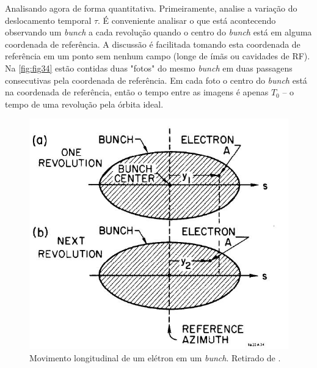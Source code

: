 Analisando agora de forma quantitativa. Primeiramente, analise a variação do deslocamento temporal $\tau$. É conveniente analisar o que está acontecendo observando um \textit{bunch} a cada revolução quando o centro do \textit{bunch} está em alguma coordenada de referência. A discussão é facilitada tomando esta coordenada de referência em um ponto sem nenhum campo (longe de ímãs ou cavidades de RF). Na \autoref{fig:fig34} estão contidas duas "fotos" do mesmo \textit{bunch} em duas passagens consecutivas pela coordenada de referência. Em cada foto o centro do \textit{bunch} está na coordenada de referência, então o tempo entre as imagens é apenas $T_0$ --  o tempo de uma revolução pela órbita ideal.

\begin{figure}[!htb]
	\centering
	\includegraphics[width=0.6\linewidth]{./Figuras/fig34.jpeg}
	\caption{Movimento longitudinal de um elétron em um \textit{bunch}. Retirado de \cite{sands1970physics}.}
	\label{fig:fig34}
\end{figure}

